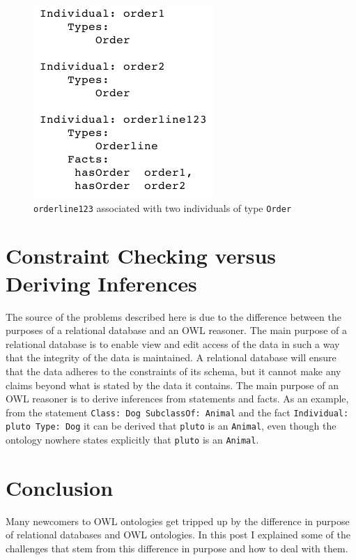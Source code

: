 \documentclass{amsart}
\begin{document}
     \begin{figure}
      \centering \includegraphics[trim = 0mm 0mm 0mm 0mm, clip, scale=0.5]{./HasTwoOrders.png}
      \vspace{-3mm}
      \caption{\texttt{orderline123} associated with two individuals of type \texttt{Order}}\label{f_HasTwoOrders}
    \end{figure}
    
  \section{Constraint Checking versus Deriving Inferences}
  The source of the problems described here is due to the difference between the purposes of a relational database and an OWL reasoner. The main purpose of a relational database is to enable view and edit access of the data in such a way that the integrity of the data is maintained. A relational database will ensure that the data adheres to the constraints of its schema, but it cannot make any claims beyond what is stated by the data it contains. The main purpose of an OWL reasoner is to derive inferences from statements and facts. As an example, from the statement \texttt{Class: Dog SubclassOf: Animal} and the fact \texttt{Individual: pluto Type: Dog} it can be derived that \texttt{pluto} is an \texttt{Animal}, even though  the ontology nowhere states explicitly that \texttt{pluto} is an \texttt{Animal}.
    
  \section{Conclusion}
  Many newcomers to OWL ontologies get tripped up by the difference in purpose of relational databases and OWL ontologies. In this post I explained some of the challenges that stem from this difference in purpose and how to deal with them. 
  
  
  
  
 
\end{document}
